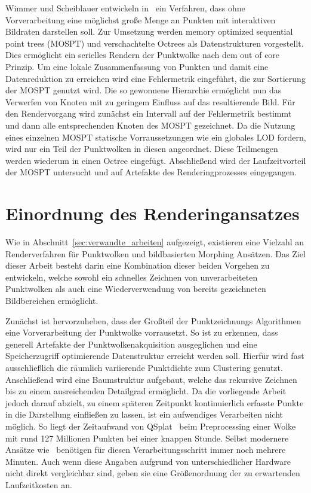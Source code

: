 \documentclass[hyperref, beleg, german]{cgvpub}
\begin{document}
Wimmer und Scheiblauer entwickeln in~\cite{wimmer2006instant} ein Verfahren,
dass ohne Vorverarbeitung eine möglichst große Menge an Punkten mit
interaktiven Bildraten darstellen soll. Zur Umsetzung werden memory optimized
sequential point trees (MOSPT) und verschachtelte Octrees als Datenstrukturen
vorgestellt. Dies ermöglicht ein serielles Rendern der Punktwolke nach dem out
of core Prinzip. Um eine lokale Zusammenfassung von Punkten und damit eine
Datenreduktion zu erreichen wird eine Fehlermetrik eingeführt, die zur
Sortierung der MOSPT genutzt wird. Die so gewonnene Hierarchie ermöglicht nun
das Verwerfen von Knoten mit zu geringem Einfluss auf das resultierende Bild.
Für den Rendervorgang wird zunächst ein Intervall auf der Fehlermetrik bestimmt
und dann alle entsprechenden Knoten des MOSPT gezeichnet. Da die Nutzung eines
einzelnen MOSPT statische Vorraussetzungen wie ein globales LOD fordern, wird
nur ein Teil der Punktwolken in diesen angeordnet. Diese Teilmengen werden
wiederum in einen Octree eingefügt. Abschließend wird der Laufzeitvorteil der
MOSPT untersucht und auf Artefakte des Renderingprozesses eingegangen.

\section{Einordnung des Renderingansatzes}

Wie in Abschnitt~\ref{sec:verwandte_arbeiten} aufgezeigt, existieren eine
Vielzahl an Renderverfahren für Punktwolken und bildbasierten Morphing
Ansätzen. Das Ziel dieser Arbeit besteht darin eine Kombination dieser beiden
Vorgehen zu entwickeln, welche sowohl ein schnelles Zeichnen von
unverarbeiteten Punktwolken als auch eine Wiederverwendung von bereits
gezeichneten Bildbereichen ermöglicht.

Zunächst ist hervorzuheben, dass der Großteil der Punktzeichnungs Algorithmen
eine Vorverarbeitung der Punktwolke vorrausetzt. So ist zu erkennen, dass
generell Artefakte der Punktwolkenakquisition ausgeglichen und eine
Speicherzugriff optimierende Datenstruktur erreicht werden soll. Hierfür wird
fast ausschließlich die räumlich variierende Punktdichte zum Clustering
genutzt. Anschließend wird eine Baumstruktur aufgebaut, welche das rekursive
Zeichnen bis zu einem ausreichenden Detailgrad ermöglicht. Da die vorliegende
Arbeit jedoch darauf abzielt, zu einem späteren Zeitpunkt kontinuierlich
erfasste Punkte in die Darstellung einfließen zu lassen, ist ein aufwendiges
Verarbeiten nicht möglich. So liegt der Zeitaufwand von
QSplat~\cite{rusinkiewicz2000qsplat} beim Preprocessing einer Wolke mit rund
127 Millionen Punkten bei einer knappen Stunde. Selbst modernere Ansätze
wie~\cite{goswami2010high} benötigen für diesen Verarbeitungsschritt immer noch
mehrere Minuten. Auch wenn diese Angaben aufgrund von unterschiedlicher
Hardware nicht direkt vergleichbar sind, geben sie eine Größenordnung der zu
erwartenden Laufzeitkosten an.
\end{document}
